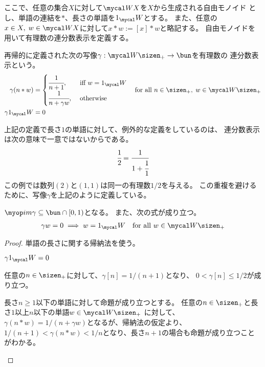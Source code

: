 	ここで、任意の集合$X$に対して$\Word X$を$X$から生成される自由モノイド
	とし、単語の連結を$*$、長さの単語を$1_\Word$とする。
	また、任意の$x\in X,\;w\in\Word X$に対して$x*w:=[x]*w$と略記する。
	自由モノイドを用いて有理数の連分数表示を定義する。

	\begin{definition}
	\label{def:有理数の連分数表示} %
		再帰的に定義された次の写像$\gamma:\Word\sizen_+\to\bun$を有理数の
		連分数表示という。
		\begin{equation*}\begin{split}
			\gamma(n*w) &= \begin{cases}
				\cfrac{1}{n + 1}, &\text{ iff } w = 1_\Word \\
				\cfrac{1}{n + \gamma w}, &\text{ otherwise } \\
			\end{cases} \quad\text{for all }n\in\sizen_+,\;w\in\Word\sizen_+ \\
			\gamma 1_\Word &= 0 \\
		\end{split}\end{equation*}
	\end{definition} %

	上記の定義で長さ$1$の単語に対して、例外的な定義をしているのは、
	連分数表示は次の意味で一意ではないからである。
	\begin{equation*}\begin{split}
		\cfrac{1}{2} = \cfrac{1}{1 + \cfrac{1}{1}}
	\end{split}\end{equation*}
	この例では数列$(2)$と$(1,1)$は同一の有理数$1/2$を与える。
	この重複を避けるために、写像$\gamma$を上記のように定義している。

	\begin{proposition}[連分数表示の範囲]\label{prop:連分数表示の範囲} %
		$\im\gamma\subseteq\bun\cap[0,1)$となる。
		また、次の式が成り立つ。
		\begin{equation*}\begin{split}
			\gamma w=0\implies w = 1_\Word \quad\text{for all }w\in\Word\sizen_+
		\end{split}\end{equation*}
	\end{proposition} %
	\begin{proof} 単語の長さに関する帰納法を使う。
	\begin{description}\setlength{\itemsep}{-1mm} %
		\item[長さ$0$] $\gamma1_\Word=0$
		\item[長さ$1$] 任意の$n\in\sizen_+$に対して、$\gamma[n]=1/(n+1)$となり、
		$0<\gamma[n]\le1/2$が成り立つ。
		\item[長さ$2$以上] 長さ$n\ge1$以下の単語に対して命題が成り立つとする。
		任意の$n\in\sizen_+$と長さ$1$以上$n$以下の単語$w\in\Word\sizen_+$
		に対して、$\gamma(n*w)=1/(n+\gamma w)$となるが、帰納法の仮定より、
		$1/(n+1)<\gamma(n*w)<1/n$となり、長さ$n+1$の場合も命題が成り立つことがわかる。
	\end{description} %
	\end{proof}

